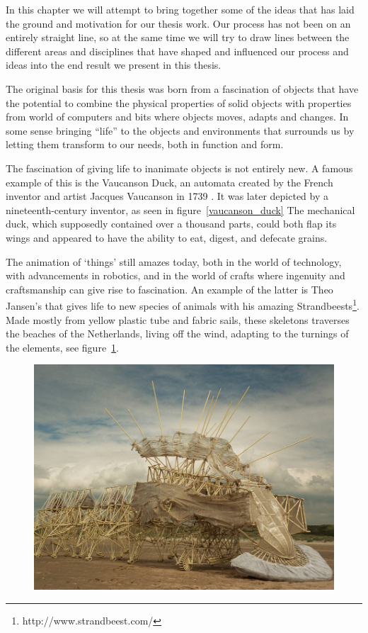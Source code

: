 In this chapter we will attempt to bring together some of the ideas that has laid the ground and motivation for our thesis work.
Our process has not been on an entirely straight line, so at the same time we will try to draw lines between the different areas and disciplines that have shaped and influenced our process and ideas into the end result we present in this thesis.  

The original basis for this thesis was born from a fascination of objects that have the potential to combine the physical properties of solid objects with properties from world of computers and bits where objects moves, adapts and changes. 
In some sense bringing ``life'' to the objects and environments that surrounds us by letting them transform to our needs, both in function and form. 

The fascination of giving life to inanimate objects is not entirely new.
A famous example of this is the Vaucanson Duck, an automata created by the French inventor and artist Jacques Vaucanson in 1739 \citep{riskin2003defecating}.
It was later depicted by a nineteenth-century inventor, as seen in figure~\ref{vaucanson_duck} 
The mechanical duck, which supposedly contained over a thousand parts, could both flap its wings and appeared to have the ability to eat, digest, and defecate grains.

The animation of `things' still amazes today, both in the world of technology, with advancements in robotics, and in the world of crafts where ingenuity and craftsmanship can give rise to fascination.   
An example of the latter is Theo Jansen's that gives life to new species of animals with his amazing Strandbeests\footnote{http://www.strandbeest.com/}.  
Made mostly from yellow plastic tube and fabric sails, these skeletons traverses the beaches of the Netherlands, living off the wind, adapting to the turnings of the elements, see figure~\ref{strandbeest}.

\begin{figure}[h]
	\centering
	\includegraphics[width=0.9\linewidth]{figures/strandbeest}
   	\label{strandbeest}
\end{figure}

